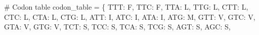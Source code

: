 \documentclass[
  letterpaper,
  DIV=11,
  numbers=noendperiod]{scrreprt}
\newenvironment{Shaded}{\begin{snugshade}}{\end{snugshade}}
\newcommand{\CommentTok}[1]{\textcolor[rgb]{0.37,0.37,0.37}{#1}}
\newcommand{\NormalTok}[1]{\textcolor[rgb]{0.00,0.23,0.31}{#1}}
\newcommand{\OperatorTok}[1]{\textcolor[rgb]{0.37,0.37,0.37}{#1}}
\newcommand{\StringTok}[1]{\textcolor[rgb]{0.13,0.47,0.30}{#1}}
\theoremstyle{definition}
\theoremstyle{remark}
\begin{document}
\begin{tcolorbox}
\begin{Shaded}
\begin{Highlighting}[]
\CommentTok{\# Codon table}
\NormalTok{codon\_table }\OperatorTok{=}\NormalTok{ \{}
    \StringTok{\textquotesingle{}TTT\textquotesingle{}}\NormalTok{: }\StringTok{\textquotesingle{}F\textquotesingle{}}\NormalTok{, }\StringTok{\textquotesingle{}TTC\textquotesingle{}}\NormalTok{: }\StringTok{\textquotesingle{}F\textquotesingle{}}\NormalTok{, }\StringTok{\textquotesingle{}TTA\textquotesingle{}}\NormalTok{: }\StringTok{\textquotesingle{}L\textquotesingle{}}\NormalTok{, }\StringTok{\textquotesingle{}TTG\textquotesingle{}}\NormalTok{: }\StringTok{\textquotesingle{}L\textquotesingle{}}\NormalTok{, }\StringTok{\textquotesingle{}CTT\textquotesingle{}}\NormalTok{: }\StringTok{\textquotesingle{}L\textquotesingle{}}\NormalTok{, }\StringTok{\textquotesingle{}CTC\textquotesingle{}}\NormalTok{: }\StringTok{\textquotesingle{}L\textquotesingle{}}\NormalTok{, }\StringTok{\textquotesingle{}CTA\textquotesingle{}}\NormalTok{: }\StringTok{\textquotesingle{}L\textquotesingle{}}\NormalTok{, }\StringTok{\textquotesingle{}CTG\textquotesingle{}}\NormalTok{: }\StringTok{\textquotesingle{}L\textquotesingle{}}\NormalTok{,}
    \StringTok{\textquotesingle{}ATT\textquotesingle{}}\NormalTok{: }\StringTok{\textquotesingle{}I\textquotesingle{}}\NormalTok{, }\StringTok{\textquotesingle{}ATC\textquotesingle{}}\NormalTok{: }\StringTok{\textquotesingle{}I\textquotesingle{}}\NormalTok{, }\StringTok{\textquotesingle{}ATA\textquotesingle{}}\NormalTok{: }\StringTok{\textquotesingle{}I\textquotesingle{}}\NormalTok{, }\StringTok{\textquotesingle{}ATG\textquotesingle{}}\NormalTok{: }\StringTok{\textquotesingle{}M\textquotesingle{}}\NormalTok{,}
    \StringTok{\textquotesingle{}GTT\textquotesingle{}}\NormalTok{: }\StringTok{\textquotesingle{}V\textquotesingle{}}\NormalTok{, }\StringTok{\textquotesingle{}GTC\textquotesingle{}}\NormalTok{: }\StringTok{\textquotesingle{}V\textquotesingle{}}\NormalTok{, }\StringTok{\textquotesingle{}GTA\textquotesingle{}}\NormalTok{: }\StringTok{\textquotesingle{}V\textquotesingle{}}\NormalTok{, }\StringTok{\textquotesingle{}GTG\textquotesingle{}}\NormalTok{: }\StringTok{\textquotesingle{}V\textquotesingle{}}\NormalTok{,}
    \StringTok{\textquotesingle{}TCT\textquotesingle{}}\NormalTok{: }\StringTok{\textquotesingle{}S\textquotesingle{}}\NormalTok{, }\StringTok{\textquotesingle{}TCC\textquotesingle{}}\NormalTok{: }\StringTok{\textquotesingle{}S\textquotesingle{}}\NormalTok{, }\StringTok{\textquotesingle{}TCA\textquotesingle{}}\NormalTok{: }\StringTok{\textquotesingle{}S\textquotesingle{}}\NormalTok{, }\StringTok{\textquotesingle{}TCG\textquotesingle{}}\NormalTok{: }\StringTok{\textquotesingle{}S\textquotesingle{}}\NormalTok{, }\StringTok{\textquotesingle{}AGT\textquotesingle{}}\NormalTok{: }\StringTok{\textquotesingle{}S\textquotesingle{}}\NormalTok{, }\StringTok{\textquotesingle{}AGC\textquotesingle{}}\NormalTok{: }\StringTok{\textquotesingle{}S\textquotesingle{}}\NormalTok{,}

\end{Highlighting}
\end{Shaded}
\end{tcolorbox}
\end{document}
